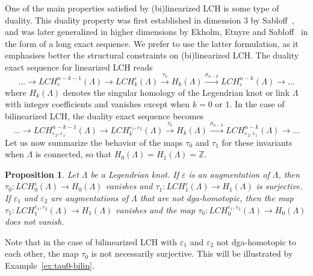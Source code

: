 \documentclass[11pt]{amsart}
\theoremstyle{plain}
\newtheorem{Prop}[defn]{Proposition}
\theoremstyle{remark}
\numberwithin{equation}{section}
\newcommand{\Z}{\ensuremath{\mathbb{Z}}}
\begin{document}
One of the main properties satisfied by (bi)linearized LCH is some type of duality. This duality property was first established in dimension $3$ by Sabloff~\cite{S}, 
and was later generalized in higher dimensions by Ekholm, Etnyre and Sabloff~\cite{EES} in the form of a long exact sequence. We prefer to use the latter formulation,
as it emphasises better the structural constraints on (bi)linearized LCH. The duality exact sequence for linearized LCH reads 
\begin{equation} \label{eq:dualityseq-lin}
\ldots \to LCH^{n-k-1}_{\varepsilon}(\Lambda) \to LCH^\varepsilon_k(\Lambda) \stackrel{\tau_k}{\longrightarrow} H_k(\Lambda) 
\stackrel{\sigma_{n-k}}{\longrightarrow} LCH^{n-k}_{\varepsilon}(\Lambda) \to \ldots
\end{equation}
where $H_k(\Lambda)$ denotes the singular homology of the Legendrian knot or link $\Lambda$ with integer coefficients and vanishes except when $k =0$ or $1$.
In the case of bilinearized LCH, the duality exact sequence becomes~\cite{BC}
\begin{equation} \label{eq:dualityseq-bilin}
\ldots \to LCH^{n-k-1}_{\varepsilon_2, \varepsilon_1}(\Lambda) \to LCH^{\varepsilon_1,\varepsilon_2}_k(\Lambda) 
\stackrel{\tau_k}{\longrightarrow} H_k(\Lambda) \stackrel{\sigma_{n-k}}{\longrightarrow} LCH^{n-k}_{\varepsilon_2, \varepsilon_1}
(\Lambda) \to \ldots
\end{equation}
Let us now summarize the behavior of the maps $\tau_0$ and $\tau_1$ for these invariants when $\Lambda$ is connected, so that
$H_0(\Lambda) = H_1(\Lambda) = \Z$.

\begin{Prop}  \label{prop:tau}
Let $\Lambda$ be a Legendrian knot. If $\varepsilon$ is an augmentation of $\Lambda$, then
$\tau_0: LCH_0^\varepsilon(\Lambda) \to H_0(\Lambda)$ vanishes and $\tau_1: LCH_1^\varepsilon(\Lambda) \to H_1(\Lambda)$
is surjective. If $\varepsilon_1$ and $\varepsilon_2$ are augmentations of $\Lambda$ that are not dga-homotopic, then the map
$\tau_1: LCH_1^{\varepsilon_1, \varepsilon_2}(\Lambda) \to H_1(\Lambda)$ vanishes and the map 
$\tau_0: LCH_0^{\varepsilon_1, \varepsilon_2}(\Lambda) \to H_0(\Lambda)$ does not vanish.
\end{Prop}

Note that in the case of bilinearized LCH with $\varepsilon_1$ and $\varepsilon_2$ not dga-homotopic to each other, the map $\tau_0$ is not
necessarily surjective. This will be illustrated by Example~\ref{ex:tau0-bilin}.
\end{document}
